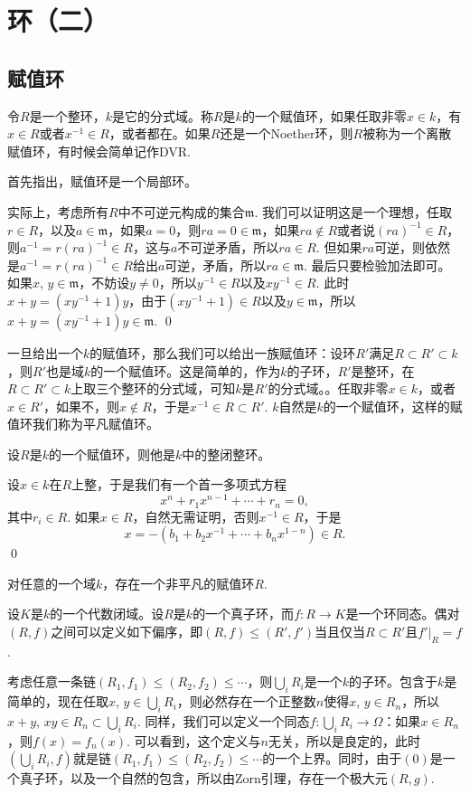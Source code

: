 \chapter{环（二）}
\section{赋值环}

\para 令$R$是一个整环，$k$是它的分式域。称$R$是$k$的一个赋值环，如果任取非零$x\in k$，有$x\in R$或者$x^{-1}\in R$，或者都在。如果$R$还是一个Noether环，则$R$被称为一个离散赋值环，有时候会简单记作DVR.

首先指出，赋值环是一个局部环。

\proof 
	实际上，考虑所有$R$中不可逆元构成的集合$\mathfrak{m}$. 我们可以证明这是一个理想，任取$r\in R$，以及$a\in\mathfrak{m}$，如果$a=0$，则$ra=0\in \mathfrak{m}$，如果$ra\not\in R$或者说$(ra)^{-1}\in R$，则$a^{-1}=r(ra)^{-1}\in R$，这与$a$不可逆矛盾，所以$ra\in R$. 但如果$ra$可逆，则依然是$a^{-1}=r(ra)^{-1}\in R$给出$a$可逆，矛盾，所以$ra\in \mathfrak{m}$. 最后只要检验加法即可。如果$x$, $y\in\mathfrak{m}$，不妨设$y\neq 0$，所以$y^{-1}\in R$以及$xy^{-1}\in R$. 此时$x+y=(xy^{-1}+1)y$，由于$(xy^{-1}+1)\in R$以及$y\in\mathfrak{m}$，所以$x+y=(xy^{-1}+1)y\in \mathfrak{m}$.
\qed

\para 一旦给出一个$k$的赋值环，那么我们可以给出一族赋值环：设环$R'$满足$R\subset R'\subset k$，则$R'$也是域$k$的一个赋值环。这是简单的，作为$k$的子环，$R'$是整环，在$R\subset R'\subset k$上取三个整环的分式域，可知$k$是$R'$的分式域。。任取非零$x\in k$，或者$x\in R'$，如果不，则$x\not\in R$，于是$x^{-1}\in R\subset R'$. $k$自然是$k$的一个赋值环，这样的赋值环我们称为平凡赋值环。

\pro 设$R$是$k$的一个赋值环，则他是$k$中的整闭整环。

\proof
	设$x\in k$在$R$上整，于是我们有一个首一多项式方程
	\[
		x^n+r_1x^{n-1}+\cdots+r_n=0,
	\]
	其中$r_i\in R$. 如果$x\in R$，自然无需证明，否则$x^{-1}\in R$，于是
	\[
		x=-(b_1+b_2x^{-1}+\cdots+b_n x^{1-n})\in R.
	\]
\qed

\pro 对任意的一个域$k$，存在一个非平凡的赋值环$R$.

\proof
	设$K$是$k$的一个代数闭域。设$R$是$k$的一个真子环，而$f:R\to K$是一个环同态。偶对$(R,f)$之间可以定义如下偏序，即$(R,f)\leq (R',f')$当且仅当$R\subset R'$且$f'|_R=f$.

	考虑任意一条链$(R_1,f_1)\leq (R_2,f_2)\leq \cdots$，则$\bigcup_i R_i$是一个$k$的子环。包含于$k$是简单的，现在任取$x$, $y\in \bigcup_i R_i$，则必然存在一个正整数$n$使得$x$, $y\in R_n$，所以$x+y$, $xy\in R_n\subset \bigcup_i R_i$. 同样，我们可以定义一个同态$f:\bigcup_i R_i\to \Omega$：如果$x\in R_n$，则$f(x)=f_n(x)$. 可以看到，这个定义与$n$无关，所以是良定的，此时$(\bigcup_i R_i,f)$就是链$(R_1,f_1)\leq (R_2,f_2)\leq \cdots$的一个上界。同时，由于$(0)$是一个真子环，以及一个自然的包含，所以由Zorn引理，存在一个极大元$(R,g)$.

